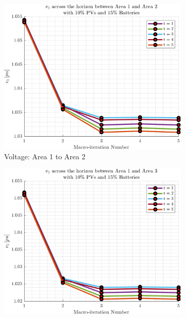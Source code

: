 \documentclass[../../outputs/main.tex]{subfiles}
\begin{document}
\begin{figure}[h!]
    \begin{subfigure}[b]{0.3\textwidth}
        \centering
        \includegraphics[width=\textwidth]{../figures/T5-pv10-batt15-vBoundary/BoundaryVoltage_vs_t_vs_macroItr_5Areas_1_2_genCost_pv_10_batt_15_.png}
        \caption{\scriptsize Voltage: Area 1 to Area 2}
        \label{fig:voltage_1_2}
    \end{subfigure}
    \hfill
    \begin{subfigure}[b]{0.3\textwidth}
        \centering
        \includegraphics[width=\textwidth]{../figures/T5-pv10-batt15-vBoundary/BoundaryVoltage_vs_t_vs_macroItr_5Areas_1_3_genCost_pv_10_batt_15_.png}

\end{subfigure}
\end{figure}
\end{document}
